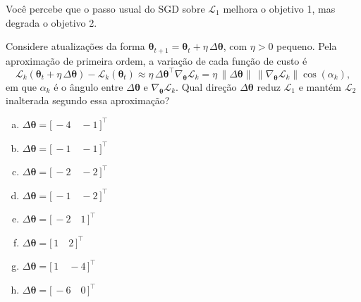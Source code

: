 \documentclass{dlproblemset}
\begin{document}
\begin{enumerate}[1)]
    Você percebe que o passo usual do SGD sobre $\mathcal{L}_1$ melhora o objetivo 1, mas degrada o objetivo 2.

    Considere atualizações da forma $\boldsymbol{\theta}_{t+1} = \boldsymbol{\theta}_t + \eta\,\Delta\boldsymbol{\theta}$, com $\eta > 0$ pequeno. Pela aproximação de primeira ordem, a variação de cada função de custo é
    \[
    \mathcal{L}_k(\boldsymbol{\theta}_t + \eta\,\Delta\boldsymbol{\theta}) - \mathcal{L}_k(\boldsymbol{\theta}_t)
    \approx \eta\,\Delta\boldsymbol{\theta}^{\top}\nabla_{\boldsymbol{\theta}}\mathcal{L}_k
    = \eta\,\|\Delta\boldsymbol{\theta}\|\,\|\nabla_{\boldsymbol{\theta}}\mathcal{L}_k\|\cos(\alpha_k),
    \]
    em que $\alpha_k$ é o ângulo entre $\Delta\boldsymbol{\theta}$ e $\nabla_{\boldsymbol{\theta}}\mathcal{L}_k$. Qual direção $\Delta\boldsymbol{\theta}$ reduz $\mathcal{L}_1$ e mantém $\mathcal{L}_2$ inalterada segundo essa aproximação?

    \begin{enumerate}[(a)]
        \item $\Delta\boldsymbol{\theta} = \bigl[\,-4 \quad -1\,\bigr]^{\top}$
        \item $\Delta\boldsymbol{\theta} = \bigl[\,-1 \quad -1\,\bigr]^{\top}$
        \item $\Delta\boldsymbol{\theta} = \bigl[\,-2 \quad -2\,\bigr]^{\top}$
        \item $\Delta\boldsymbol{\theta} = \bigl[\,-1 \quad -2\,\bigr]^{\top}$
        \item $\Delta\boldsymbol{\theta} = \bigl[\,-2 \quad 1\,\bigr]^{\top}$
        \item $\Delta\boldsymbol{\theta} = \bigl[\,1 \quad 2\,\bigr]^{\top}$
        \item $\Delta\boldsymbol{\theta} = \bigl[\,1 \quad -4\,\bigr]^{\top}$
        \item $\Delta\boldsymbol{\theta} = \bigl[\,-6 \quad 0\,\bigr]^{\top}$
    \end{enumerate}


\end{enumerate}
\end{document}

